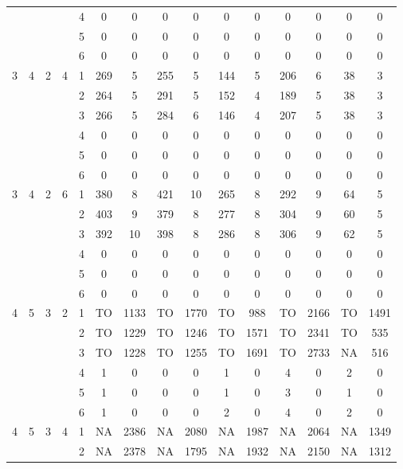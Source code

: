 \begin{longtable}{|c|c|c|c|c|c c|c c|c c|c c|c c|}
 & & & & 4 & 0 & 0 & 0 & 0 & 0 & 0 & 0 & 0 & 0 & 0 \\
 & & & & 5 & 0 & 0 & 0 & 0 & 0 & 0 & 0 & 0 & 0 & 0 \\
 & & & & 6 & 0 & 0 & 0 & 0 & 0 & 0 & 0 & 0 & 0 & 0 \\
\hline
\multirow{6}{*}{3} & \multirow{6}{*}{4} & \multirow{6}{*}{2} & \multirow{6}{*}{4} & 1 & 269 & 5 & 255 & 5 & 144 & 5 & 206 & 6 & 38 & 3 \\
 & & & & 2 & 264 & 5 & 291 & 5 & 152 & 4 & 189 & 5 & 38 & 3 \\
 & & & & 3 & 266 & 5 & 284 & 6 & 146 & 4 & 207 & 5 & 38 & 3 \\
 & & & & 4 & 0 & 0 & 0 & 0 & 0 & 0 & 0 & 0 & 0 & 0 \\
 & & & & 5 & 0 & 0 & 0 & 0 & 0 & 0 & 0 & 0 & 0 & 0 \\
 & & & & 6 & 0 & 0 & 0 & 0 & 0 & 0 & 0 & 0 & 0 & 0 \\
\hline
\multirow{6}{*}{3} & \multirow{6}{*}{4} & \multirow{6}{*}{2} & \multirow{6}{*}{6} & 1 & 380 & 8 & 421 & 10 & 265 & 8 & 292 & 9 & 64 & 5 \\
 & & & & 2 & 403 & 9 & 379 & 8 & 277 & 8 & 304 & 9 & 60 & 5 \\
 & & & & 3 & 392 & 10 & 398 & 8 & 286 & 8 & 306 & 9 & 62 & 5 \\
 & & & & 4 & 0 & 0 & 0 & 0 & 0 & 0 & 0 & 0 & 0 & 0 \\
 & & & & 5 & 0 & 0 & 0 & 0 & 0 & 0 & 0 & 0 & 0 & 0 \\
 & & & & 6 & 0 & 0 & 0 & 0 & 0 & 0 & 0 & 0 & 0 & 0 \\
\hline
\multirow{6}{*}{4} & \multirow{6}{*}{5} & \multirow{6}{*}{3} & \multirow{6}{*}{2} & 1 & TO & 1133 & TO & 1770 & TO & 988 & TO & 2166 & TO & 1491 \\
 & & & & 2 & TO & 1229 & TO & 1246 & TO & 1571 & TO & 2341 & TO & 535 \\
 & & & & 3 & TO & 1228 & TO & 1255 & TO & 1691 & TO & 2733 & NA & 516 \\
 & & & & 4 & 1 & 0 & 0 & 0 & 1 & 0 & 4 & 0 & 2 & 0 \\
 & & & & 5 & 1 & 0 & 0 & 0 & 1 & 0 & 3 & 0 & 1 & 0 \\
 & & & & 6 & 1 & 0 & 0 & 0 & 2 & 0 & 4 & 0 & 2 & 0 \\
\hline
\multirow{6}{*}{4} & \multirow{6}{*}{5} & \multirow{6}{*}{3} & \multirow{6}{*}{4} & 1 & NA & 2386 & NA & 2080 & NA & 1987 & NA & 2064 & NA & 1349 \\
 & & & & 2 & NA & 2378 & NA & 1795 & NA & 1932 & NA & 2150 & NA & 1312 \\

\end{longtable}
